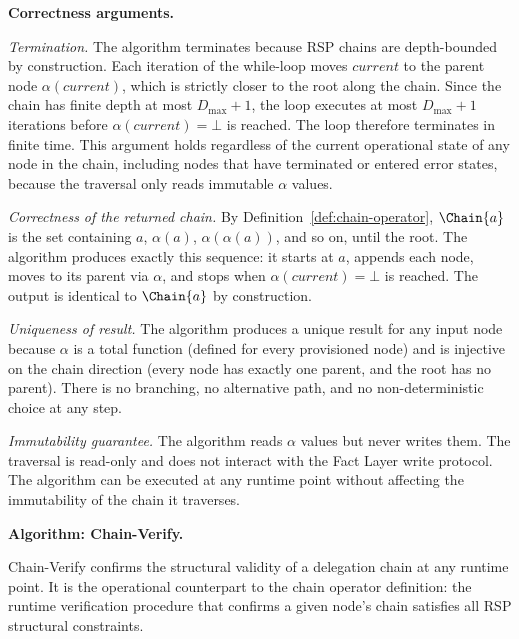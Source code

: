 \medskip
\noindent\textbf{Correctness arguments.}

\textit{Termination.} The algorithm terminates because RSP chains are depth-bounded by construction. Each iteration of the while-loop moves $current$ to the parent node $\alpha(current)$, which is strictly closer to the root along the chain. Since the chain has finite depth at most $D_{\max} + 1$, the loop executes at most $D_{\max} + 1$ iterations before $\alpha(current) = \bot$ is reached. The loop therefore terminates in finite time. This argument holds regardless of the current operational state of any node in the chain, including nodes that have terminated or entered error states, because the traversal only reads immutable $\alpha$ values.

\textit{Correctness of the returned chain.} By Definition~\ref{def:chain-operator}, $\Chain{a}$ is the set containing $a$, $\alpha(a)$, $\alpha(\alpha(a))$, and so on, until the root. The algorithm produces exactly this sequence: it starts at $a$, appends each node, moves to its parent via $\alpha$, and stops when $\alpha(current) = \bot$ is reached. The output is identical to $\Chain{a}$ by construction.

\textit{Uniqueness of result.} The algorithm produces a unique result for any input node because $\alpha$ is a total function (defined for every provisioned node) and is injective on the chain direction (every node has exactly one parent, and the root has no parent). There is no branching, no alternative path, and no non-deterministic choice at any step.

\textit{Immutability guarantee.} The algorithm reads $\alpha$ values but never writes them. The traversal is read-only and does not interact with the Fact Layer write protocol. The algorithm can be executed at any runtime point without affecting the immutability of the chain it traverses.

\medskip
\noindent\textbf{Algorithm: Chain-Verify.}

Chain-Verify confirms the structural validity of a delegation chain at any runtime point. It is the operational counterpart to the chain operator definition: the runtime verification procedure that confirms a given node's chain satisfies all RSP structural constraints.

